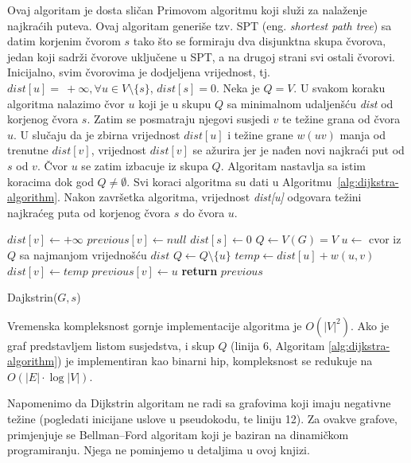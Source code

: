 \documentclass[a4paper, utf8, 11pt, colorlinks]{article}
\begin{document}
Ovaj algoritam je dosta sličan Primovom algoritmu koji služi za nalaženje najkraćih puteva. Ovaj algoritam generiše tzv. SPT (eng. \emph{shortest path tree}) sa datim korjenim čvorom $s$ tako  što se formiraju dva disjunktna skupa čvorova, jedan koji sadrži čvorove uključene u SPT, a na drugoj strani svi ostali čvorovi. Inicijalno, svim čvorovima je dodjeljena vrijednost, tj. $dist[u]=\ +\infty, \forall u \in V\setminus \{s\}$, $dist[s]=0$. Neka je $Q = V$. 
U svakom koraku algoritma nalazimo čvor $u$ koji je u skupu $Q$ sa minimalnom udaljenšću \emph{dist} od korjenog čvora $s$. Zatim se posmatraju njegovi susjedi $v$ te težine grana od čvora $u$. U slučaju da je zbirna vrijednost $dist[u]$  i težine grane $w(uv)$ manja od trenutne $dist[v]$, vrijednost $dist[v]$ se ažurira jer je nađen novi najkraći put od $s$ od $v$.  Čvor $u$ se zatim izbacuje iz skupa $Q$. Algoritam nastavlja sa istim koracima dok god $Q \neq \emptyset$. 
Svi koraci algoritma su dati u Algoritmu~\ref{alg:dijkstra-algorithm}. Nakon završetka algoritma, vrijednost \emph{dist[u]} odgovara težini najkraćeg puta od korjenog čvora $s$ do čvora $u$. 


\begin{algorithm}[!ht]
	\begin{algorithmic}[1]
	      	\STATE   $dist[v] \gets +\infty$ 	%
		    \STATE $previous[v] \gets null$ 	%
		\ENDFOR
		\STATE	$dist[s] \gets 0$ 	 
		\STATE	$Q \gets V(G)=V$
		\STATE $u \gets$ cvor iz $Q$ sa najmanjom vrijednošću $dist$
		\STATE $Q \gets Q \setminus \{u\}$
		\STATE $temp \gets dist[u] + w(u, v)$
		\STATE  $dist[v] \gets temp$
		\STATE $previous[v] \gets u$ 
		\ENDIF
		\ENDFOR
		\ENDWHILE
		\STATE	\textbf{return} $previous$ 
	\end{algorithmic}
    		\caption{Dajkstrin($G,s $)}\label{alg:dijkstra-algorithm}
\end{algorithm}

Vremenska kompleksnost gornje implementacije algoritma je $O(|V|^2)$. Ako je graf predstavljem listom susjedstva, i skup $Q$ (linija 6, Algoritam \ref{alg:dijkstra-algorithm}) je implementiran kao binarni hip, 
kompleksnost se redukuje na $O(|E| \cdot \log |V|)$.

Napomenimo da Dijkstrin algoritam ne radi sa grafovima koji imaju negativne težine (pogledati inicijane uslove u  pseudokodu, te liniju 12).  Za ovakve grafove,  primjenjuje se Bellman–Ford algoritam koji je baziran na dinamičkom programiranju. Njega ne pominjemo u detaljima u ovoj knjizi.  %
\end{document}
